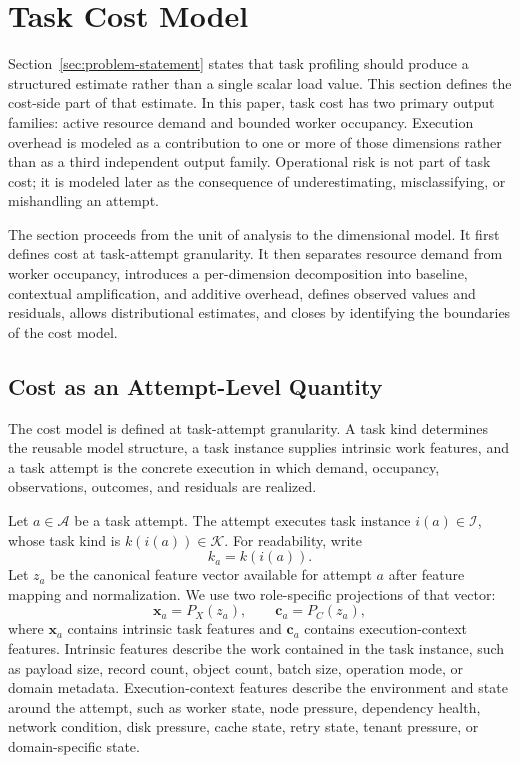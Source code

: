 \section{Task Cost Model}
\label{sec:task-cost-model}

Section~\ref{sec:problem-statement} states that task profiling should produce a
structured estimate rather than a single scalar load value. This section defines
the cost-side part of that estimate. In this paper, task cost has two primary
output families: active resource demand and bounded worker occupancy. Execution
overhead is modeled as a contribution to one or more of those dimensions rather
than as a third independent output family. Operational risk is not part of task
cost; it is modeled later as the consequence of underestimating,
misclassifying, or mishandling an attempt.

The section proceeds from the unit of analysis to the dimensional model. It
first defines cost at task-attempt granularity. It then separates resource demand
from worker occupancy, introduces a per-dimension decomposition into baseline,
contextual amplification, and additive overhead, defines observed values and
residuals, allows distributional estimates, and closes by identifying the
boundaries of the cost model.

\subsection{Cost as an Attempt-Level Quantity}
\label{sec:cost-attempt-level}

The cost model is defined at task-attempt granularity. A task kind determines
the reusable model structure, a task instance supplies intrinsic work features,
and a task attempt is the concrete execution in which demand, occupancy,
observations, outcomes, and residuals are realized.

Let $a \in \mathcal{A}$ be a task attempt. The attempt executes task instance
$i(a) \in \mathcal{I}$, whose task kind is $k(i(a)) \in \mathcal{K}$. For
readability, write
\[
k_a = k(i(a)).
\]
Let $z_a$ be the canonical feature vector available for attempt $a$ after
feature mapping and normalization. We use two role-specific projections of that
vector:
\[
\mathbf{x}_a = P_X(z_a),
\qquad
\mathbf{c}_a = P_C(z_a),
\]
where $\mathbf{x}_a$ contains intrinsic task features and $\mathbf{c}_a$
contains execution-context features. Intrinsic features describe the work
contained in the task instance, such as payload size, record count, object
count, batch size, operation mode, or domain metadata. Execution-context
features describe the environment and state around the attempt, such as worker
state, node pressure, dependency health, network condition, disk pressure, cache
state, retry state, tenant pressure, or domain-specific state.


